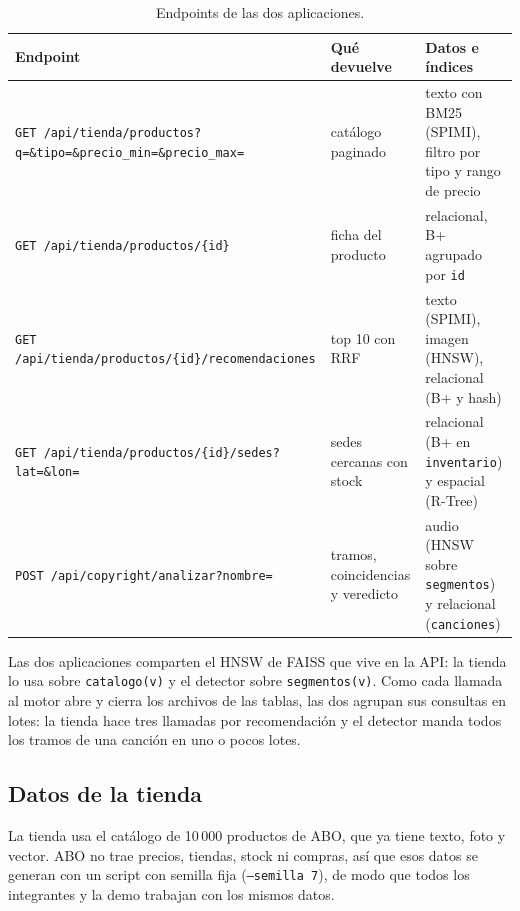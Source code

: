 \documentclass[11pt,a4paper]{article}
\begin{document}
\begin{table}[H]
\centering
\small
\begin{tabular}{>{\raggedright\arraybackslash}p{5.6cm}>{\raggedright\arraybackslash}p{3.6cm}>{\raggedright\arraybackslash}p{5.2cm}}
\toprule
Endpoint & Qué devuelve & Datos e índices \\
\midrule
\texttt{GET /api/tienda/\allowbreak productos?q=\&tipo=\&\allowbreak precio\_min=\&precio\_max=} & catálogo paginado & texto con BM25 (SPIMI), filtro por tipo y rango de precio \\
\texttt{GET /api/tienda/\allowbreak productos/\{id\}} & ficha del producto & relacional, B+ agrupado por \texttt{id} \\
\texttt{GET /api/tienda/\allowbreak productos/\{id\}/\allowbreak recomendaciones} & top 10 con RRF & texto (SPIMI), imagen (HNSW), relacional (B+ y hash) \\
\texttt{GET /api/tienda/\allowbreak productos/\{id\}/\allowbreak sedes?lat=\&lon=} & 3 sedes cercanas con stock & relacional (B+ en \texttt{inventario}) y espacial (R-Tree) \\
\texttt{POST /api/copyright/\allowbreak analizar?nombre=} & tramos, coincidencias y veredicto & audio (HNSW sobre \texttt{segmentos}) y relacional (\texttt{canciones}) \\
\bottomrule
\end{tabular}
\caption{Endpoints de las dos aplicaciones.}
\label{tab:endpoints}
\end{table}

Las dos aplicaciones comparten el HNSW de FAISS que vive en la API: la tienda lo usa sobre \texttt{catalogo(v)} y el detector sobre \texttt{segmentos(v)}. Como cada llamada al motor abre y cierra los archivos de las tablas, las dos agrupan sus consultas en lotes: la tienda hace tres llamadas por recomendación y el detector manda todos los tramos de una canción en uno o pocos lotes.

\subsection{Datos de la tienda}
\label{sec:datos-tienda}

La tienda usa el catálogo de 10\,000 productos de ABO, que ya tiene texto, foto y vector. ABO no trae precios, tiendas, stock ni compras, así que esos datos se generan con un script con semilla fija (\texttt{--semilla 7}), de modo que todos los integrantes y la demo trabajan con los mismos datos.
\end{document}
